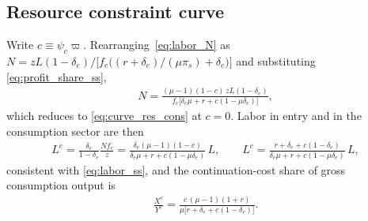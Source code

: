\documentclass[authoryear, review, 12pt]{elsarticle}
\begin{document}
\subsection{Resource constraint curve}
Write $c\equiv\psi_c\varpi$. Rearranging~\eqref{eq:labor_N} as
$N=zL(1-\delta_e)/\bigl[f_e\bigl((r+\delta_e)/(\mu\pi_s)+\delta_e\bigr)\bigr]$ and substituting
\eqref{eq:profit_share_ss},
\begin{align*}
	N=\frac{(\mu-1)(1-c)\,zL(1-\delta_e)}{f_e\bigl[\delta_e\mu+r+c(1-\mu\delta_e)\bigr]},
\end{align*}
which reduces to \eqref{eq:curve_res_cons} at $c=0$. Labor in entry and in the consumption
sector are then
\begin{align*}
	L^e=\frac{\delta_e}{1-\delta_e}\frac{Nf_e}{z}
	=\frac{\delta_e(\mu-1)(1-c)}{\delta_e\mu+r+c(1-\mu\delta_e)}\,L,
	\qquad
	L^c=\frac{r+\delta_e+c(1-\delta_e)}{\delta_e\mu+r+c(1-\mu\delta_e)}\,L,
\end{align*}
consistent with \eqref{eq:labor_ss}, and the continuation-cost share of gross consumption
output is
\begin{align*}
	\frac{X^c}{Y^c}=\frac{c\,(\mu-1)(1+r)}{\mu\bigl[r+\delta_e+c(1-\delta_e)\bigr]}.
\end{align*}
\end{document}
